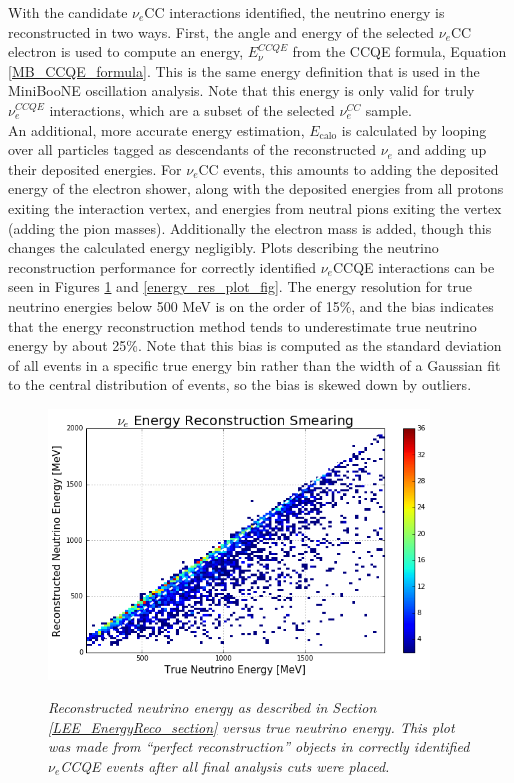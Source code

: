 With the candidate $\nu_e$CC interactions identified, the neutrino energy is reconstructed in two ways. First, the angle and energy of the selected $\nu_e$CC electron is used to compute an energy, $E_\nu^{CCQE}$ from the CCQE formula, Equation \ref{MB_CCQE_formula}. This is the same energy definition that is used in the MiniBooNE oscillation analysis. Note that this energy is only valid for truly $\nu_e^{CCQE}$ interactions, which are a subset of the selected $\nu_e^{CC}$ sample.\\

An additional, more accurate energy estimation, $E_{\text{calo}}$ is calculated by looping over all particles tagged as descendants of the reconstructed $\nu_e$ and adding up their deposited energies. For $\nu_e$CC events, this amounts to adding the deposited energy of the electron shower, along with the deposited energies from all protons exiting the interaction vertex, and energies from neutral pions exiting the vertex (adding the pion masses). Additionally the electron mass is added, though this changes the calculated energy negligibly. Plots describing the neutrino reconstruction performance for correctly identified $\nu_e$CCQE interactions can be seen in Figures \ref{energy_smear_plot_fig} and \ref{energy_res_plot_fig}. The energy resolution for true neutrino energies below 500 MeV is on the order of 15\%, and the bias indicates that the energy reconstruction method tends to underestimate true neutrino energy by about 25\%. Note that this bias is computed as the standard deviation of all events in a specific true energy bin rather than the width of a Gaussian fit to the central distribution of events, so the bias is skewed down by outliers.

\begin{figure}[ht!]
\centering
\includegraphics[width=0.9\textwidth]{Figures/LEE_EnergySmear_WithAnalysisCuts.png}\\%
\caption{\textit{Reconstructed neutrino energy as described in Section \ref{LEE_EnergyReco_section} versus true neutrino energy. This plot was made from ``perfect reconstruction'' objects in correctly identified $\nu_e$CCQE events after all final analysis cuts were placed.}}
\label{energy_smear_plot_fig}
\end{figure}

